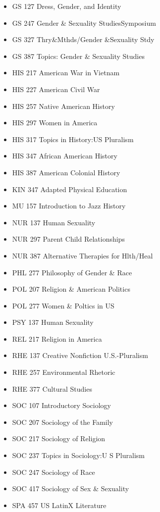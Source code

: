 \documentclass[
  letterpaper,
]{scrbook}
\begin{document}
\begin{itemize}
\item
  GS 127 Dress, Gender, and Identity
\item
  GS 247 Gender \& Sexuality StudiesSymposium
\item
  GS 327 Thry\&Mthds/Gender \&Sexuality Stdy
\item
  GS 387 Topics: Gender \& Sexuality Studies
\item
  HIS 217 American War in Vietnam
\item
  HIS 227 American Civil War\\
\item
  HIS 257 Native American History
\item
  HIS 297 Women in America\\
\item
  HIS 317 Topics in History:US Pluralism\\
\item
  HIS 347 African American History
\item
  HIS 387 American Colonial History
\item
  KIN 347 Adapted Physical Education
\item
  MU 157 Introduction to Jazz History
\item
  NUR 137 Human Sexuality\\
\item
  NUR 297 Parent Child Relationships\\
\item
  NUR 387 Alternative Therapies for Hlth/Heal
\item
  PHL 277 Philosophy of Gender \& Race
\item
  POL 207 Religion \& American Politics
\item
  POL 277 Women \& Poltics in US
\item
  PSY 137 Human Sexuality\\
\item
  REL 217 Religion in America\\
\item
  RHE 137 Creative Nonfiction U.S.-Pluralism
\item
  RHE 257 Environmental Rhetoric\\
\item
  RHE 377 Cultural Studies\\
\item
  SOC 107 Introductory Sociology\\
\item
  SOC 207 Sociology of the Family\\
\item
  SOC 217 Sociology of Religion
\item
  SOC 237 Topics in Sociology:U S Pluralism
\item
  SOC 247 Sociology of Race
\item
  SOC 417 Sociology of Sex \& Sexuality
\item
  SPA 457 US LatinX Literature
\end{itemize}
\end{document}
